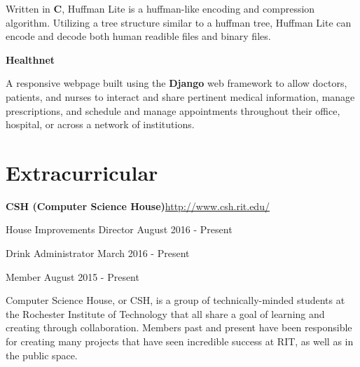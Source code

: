 \documentclass[margin,line]{resume}
\newcommand{\rurl}[1]{\hfill {\footnotesize \url{#1}}}
\begin{document}
\begin{resume}
\begin{asparablank}
		\small Written in \textbf{C}, Huffman Lite is a huffman-like encoding and compression algorithm. Utilizing a tree structure similar to a huffman tree, Huffman Lite can encode and decode both human readible files and binary files.
		\normalsize
		\\
        \item {\bf Healthnet}\rurl{}
        
        \small A responsive webpage built using the \textbf{Django} web framework to allow doctors, patients, and nurses to interact and share pertinent medical information, manage prescriptions, and schedule and manage appointments throughout their office, hospital, or across a network of institutions.
          
	\end{asparablank}    
    
\section{\mysidestyle Extracurricular}
	\begin{asparablank}
		\item {\bf CSH ({\small Computer Science House})}\rurl{http://www.csh.rit.edu/}
		\small	\item House Improvements Director \hfill August 2016 - Present
        \small  \item Drink Administrator \hfill March 2016 - Present
        \small  \item Member \hfill August 2015 - Present
        \linebreak
        
        \small Computer Science House, or CSH, is a group of technically-minded students at the Rochester Institute of Technology that all share a goal of learning and creating through collaboration. Members past and present have been responsible for creating many projects that have seen incredible success at RIT, as well as in the public space.
	\end{asparablank}
    

\end{resume}
\end{document}
